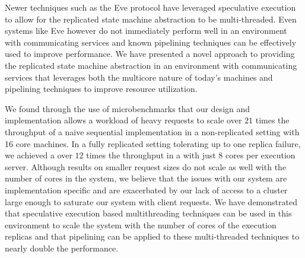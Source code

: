 \documentclass[11pt, oneside]{report}
\begin{document}
Newer techniques such as the Eve protocol \cite{eve} have leveraged speculative execution to allow for the replicated state machine abstraction to be multi-threaded.
Even systems like Eve however do not immediately perform well in an environment with communicating services and known pipelining techniques can be effectively used to improve performance.
We have presented a novel approach to providing the replicated state machine abstraction in an environment with communicating services that leverages both the multicore nature of today's machines and pipelining techniques to improve resource utilization. 

We found through the use of microbenchmarks that our design and implementation allows a workload of heavy requests to scale over $21$ times the throughput of a naive sequential implementation in a non-replicated setting with 16 core machines.
In a fully replicated setting tolerating up to one replica failure, we achieved a over $12$ times the throughput in a with just 8 cores per execution server.
Although results on smaller request sizes do not scale as well with the number of cores in the system, we believe that the issues with our system are implementation specific and are exacerbated by our lack of access to a cluster large enough to saturate our system with client requests.
We have demonstrated that speculative execution based multithreading techniques can be used in this environment to scale the system with the number of cores of the execution replicas and that pipelining can be applied to these multi-threaded techniques to nearly double the performance.



\end{document}
